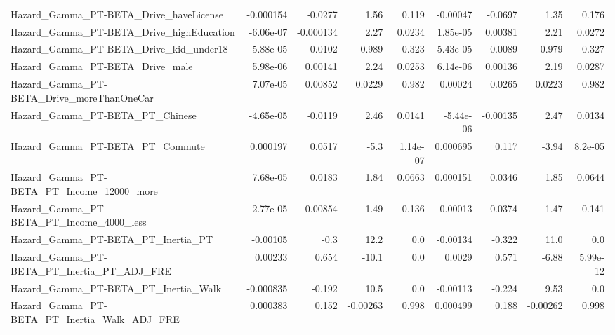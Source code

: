 \begin{tabular}{lrrrrrrrr}
Hazard\_Gamma\_PT-BETA\_Drive\_haveLicense             &   -0.000154 &      -0.0277 &     1.56 &    0.119 &   -0.00047 &     -0.0697 &         1.35 &         0.176 \\
Hazard\_Gamma\_PT-BETA\_Drive\_highEducation           &   -6.06e-07 &    -0.000134 &     2.27 &   0.0234 &   1.85e-05 &     0.00381 &         2.21 &        0.0272 \\
Hazard\_Gamma\_PT-BETA\_Drive\_kid\_under18             &    5.88e-05 &       0.0102 &    0.989 &    0.323 &   5.43e-05 &      0.0089 &        0.979 &         0.327 \\
Hazard\_Gamma\_PT-BETA\_Drive\_male                    &    5.98e-06 &      0.00141 &     2.24 &   0.0253 &   6.14e-06 &     0.00136 &         2.19 &        0.0287 \\
Hazard\_Gamma\_PT-BETA\_Drive\_moreThanOneCar          &    7.07e-05 &      0.00852 &   0.0229 &    0.982 &    0.00024 &      0.0265 &       0.0223 &         0.982 \\
Hazard\_Gamma\_PT-BETA\_PT\_Chinese                    &   -4.65e-05 &      -0.0119 &     2.46 &   0.0141 &  -5.44e-06 &    -0.00135 &         2.47 &        0.0134 \\
Hazard\_Gamma\_PT-BETA\_PT\_Commute                    &    0.000197 &       0.0517 &     -5.3 & 1.14e-07 &   0.000695 &       0.117 &        -3.94 &       8.2e-05 \\
Hazard\_Gamma\_PT-BETA\_PT\_Income\_12000\_more          &    7.68e-05 &       0.0183 &     1.84 &   0.0663 &   0.000151 &      0.0346 &         1.85 &        0.0644 \\
Hazard\_Gamma\_PT-BETA\_PT\_Income\_4000\_less           &    2.77e-05 &      0.00854 &     1.49 &    0.136 &    0.00013 &      0.0374 &         1.47 &         0.141 \\
Hazard\_Gamma\_PT-BETA\_PT\_Inertia\_PT                 &    -0.00105 &         -0.3 &     12.2 &      0.0 &   -0.00134 &      -0.322 &         11.0 &           0.0 \\
Hazard\_Gamma\_PT-BETA\_PT\_Inertia\_PT\_ADJ\_FRE         &     0.00233 &        0.654 &    -10.1 &      0.0 &     0.0029 &       0.571 &        -6.88 &      5.99e-12 \\
Hazard\_Gamma\_PT-BETA\_PT\_Inertia\_Walk               &   -0.000835 &       -0.192 &     10.5 &      0.0 &   -0.00113 &      -0.224 &         9.53 &           0.0 \\
Hazard\_Gamma\_PT-BETA\_PT\_Inertia\_Walk\_ADJ\_FRE       &    0.000383 &        0.152 & -0.00263 &    0.998 &   0.000499 &       0.188 &     -0.00262 &         0.998 \\

\end{tabular}
